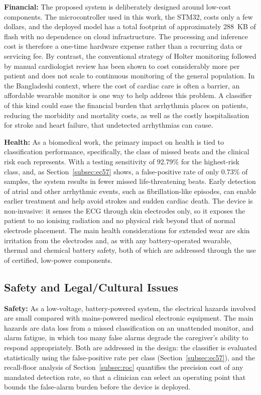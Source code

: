 \textbf{Financial:} The proposed system is deliberately designed around
low-cost components. The microcontroller used in this work, the STM32,
costs only a few dollars, and the deployed model has a total footprint of
approximately 288~KB of flash with no dependence on cloud infrastructure.
The processing and inference cost is therefore a one-time hardware
expense rather than a recurring data or servicing fee. By contrast, the
conventional strategy of Holter monitoring followed by manual cardiologist
review has been shown to cost considerably more per patient and does not
scale to continuous monitoring of the general population. In the
Bangladeshi context, where the cost of cardiac care is often a barrier, an
affordable wearable monitor is one way to help address this problem. A
classifier of this kind could ease the financial burden that arrhythmia
places on patients, reducing the morbidity and mortality costs, as well
as the costly hospitalisation for stroke and heart failure, that
undetected arrhythmias can cause.

\textbf{Health:} As a biomedical work, the primary impact on health is
tied to classification performance, specifically, the class of missed
beats and the clinical risk each represents. With a testing sensitivity
of 92.79\% for the highest-risk class, and, as Section~\ref{subsec:ec57}
shows, a false-positive rate of only 0.73\% of samples, the system results
in fewer missed life-threatening beats. Early detection of atrial and
other arrhythmic events, such as fibrillation-like episodes, can enable
earlier treatment and help avoid strokes and sudden cardiac death. The
device is non-invasive: it senses the ECG through skin electrodes only, so
it exposes the patient to no ionising radiation and no physical risk
beyond that of normal electrode placement. The main health considerations
for extended wear are skin irritation from the electrodes and, as with any
battery-operated wearable, thermal and chemical battery safety, both of
which are addressed through the use of certified, low-power components.

\subsection{Safety and Legal/Cultural Issues}
\label{subsec:safety_legal_cultural}

\textbf{Safety:} As a low-voltage, battery-powered system, the electrical
hazards involved are small compared with mains-powered medical electronic
equipment. The main hazards are data loss from a missed classification on
an unattended monitor, and alarm fatigue, in which too many false alarms
degrade the caregiver's ability to respond appropriately. Both are
addressed in the design: the classifier is evaluated statistically using
the false-positive rate per class (Section~\ref{subsec:ec57}), and the
recall-floor analysis of Section~\ref{subsec:roc} quantifies the precision
cost of any mandated detection rate, so that a clinician can select an
operating point that bounds the false-alarm burden before the device is
deployed.

